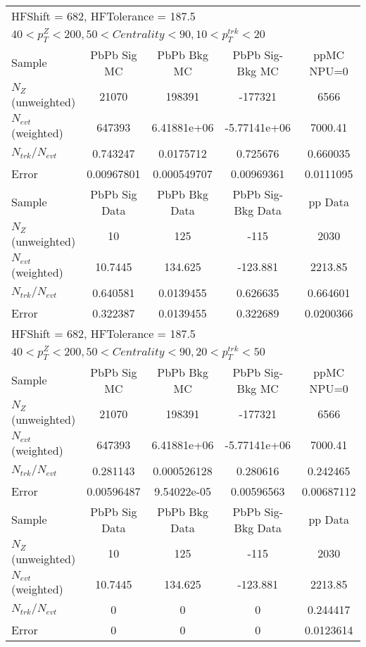 \begin{table}[h!]
\centering
\begin{tabular}{|l|c|c|c|c|}
\multicolumn{5}{l}{ HFShift = 682, HFTolerance = 187.5}\\
\multicolumn{5}{l}{ $40 < p_{T}^{Z} < 200, 50 < Centrality < 90, 10 < p_{T}^{trk} < 20$}\\
\hline\hline
Sample         & PbPb Sig MC    & PbPb Bkg MC    & PbPb Sig-Bkg MC& ppMC NPU=0     \\
$N_Z$ (unweighted)& 21070          & 198391         & -177321        & 6566           \\
$N_{evt}$ (weighted)& 647393         & 6.41881e+06    & -5.77141e+06   & 7000.41        \\
$N_{trk}/N_{evt}$& 0.743247       & 0.0175712      & 0.725676       & 0.660035       \\
Error          & 0.00967801     & 0.000549707    & 0.00969361     & 0.0111095      \\
\hline
Sample         & PbPb Sig Data  & PbPb Bkg Data  & PbPb Sig-Bkg Data& pp Data  \\
$N_Z$ (unweighted)& 10             & 125            & -115           & 2030           \\
$N_{evt}$ (weighted)& 10.7445        & 134.625        & -123.881       & 2213.85        \\
$N_{trk}/N_{evt}$& 0.640581       & 0.0139455      & 0.626635       & 0.664601       \\
Error          & 0.322387       & 0.0139455      & 0.322689       & 0.0200366      \\
\hline\hline
\multicolumn{5}{l}{ HFShift = 682, HFTolerance = 187.5}\\
\multicolumn{5}{l}{ $40 < p_{T}^{Z} < 200, 50 < Centrality < 90, 20 < p_{T}^{trk} < 50$}\\
\hline\hline
Sample         & PbPb Sig MC    & PbPb Bkg MC    & PbPb Sig-Bkg MC& ppMC NPU=0     \\
$N_Z$ (unweighted)& 21070          & 198391         & -177321        & 6566           \\
$N_{evt}$ (weighted)& 647393         & 6.41881e+06    & -5.77141e+06   & 7000.41        \\
$N_{trk}/N_{evt}$& 0.281143       & 0.000526128    & 0.280616       & 0.242465       \\
Error          & 0.00596487     & 9.54022e-05    & 0.00596563     & 0.00687112     \\
\hline
Sample         & PbPb Sig Data  & PbPb Bkg Data  & PbPb Sig-Bkg Data& pp Data  \\
$N_Z$ (unweighted)& 10             & 125            & -115           & 2030           \\
$N_{evt}$ (weighted)& 10.7445        & 134.625        & -123.881       & 2213.85        \\
$N_{trk}/N_{evt}$& 0              & 0              & 0              & 0.244417       \\
Error          & 0              & 0              & 0              & 0.0123614      \\
\hline\hline
\end{tabular}
\end{table}
